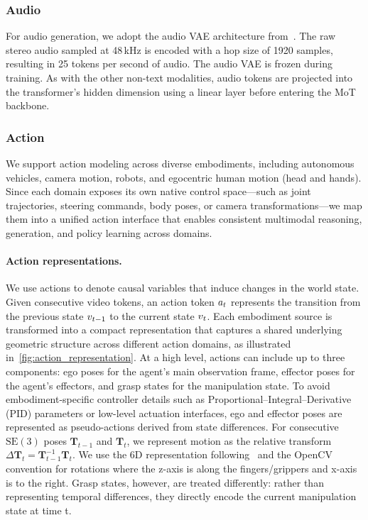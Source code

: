 \subsubsection{Audio}
For audio generation, we adopt the audio VAE architecture from~\citet{lee2024etta}. The raw stereo audio sampled at 48\,kHz is encoded with a hop size of 1920 samples, resulting in 25 tokens per second of audio. The audio VAE is frozen during training. As with the other non-text modalities, audio tokens are projected into the transformer's hidden dimension using a linear layer before entering the MoT backbone.

\subsubsection{Action}
\label{sec:action}
We support action modeling across diverse embodiments, including autonomous vehicles, camera motion, robots, and egocentric human motion (head and hands). Since each domain exposes its own native control space---such as joint trajectories, steering commands, body poses, or camera transformations---we map them into a unified action interface that enables consistent multimodal reasoning, generation, and policy learning across domains.

\paragraph{Action representations.}
We use actions to denote causal variables that induce changes in the world state.
Given consecutive video tokens, an action token $a_{t}$ represents the transition from the previous state $v_{t{-}1}$ to the current state $v_{t}$.
Each embodiment source is transformed into a compact representation that captures a shared underlying geometric structure across different action domains, as illustrated in~\cref{fig:action_representation}.
At a high level, actions can include up to three components: ego poses for the agent's main observation frame, effector poses for the agent's effectors, and grasp states for the manipulation state.
To avoid embodiment-specific controller details such as Proportional–Integral–Derivative (PID) parameters or low-level actuation interfaces, ego and effector poses are represented as pseudo-actions derived from state differences.
For consecutive $\mathrm{SE}(3)$ poses $\mathbf{T}_{t-1}$ and $\mathbf{T}_t$, we represent motion as the relative transform $\Delta \mathbf{T}_t = \mathbf{T}_{t-1}^{-1}\mathbf{T}_t$.
We use the 6D representation following~\citet{zhou2019continuity} and the OpenCV convention for rotations where the z-axis is along the fingers/grippers and x-axis is to the right.
Grasp states, however, are treated differently: rather than representing temporal differences, they directly encode the current manipulation state at time t.

